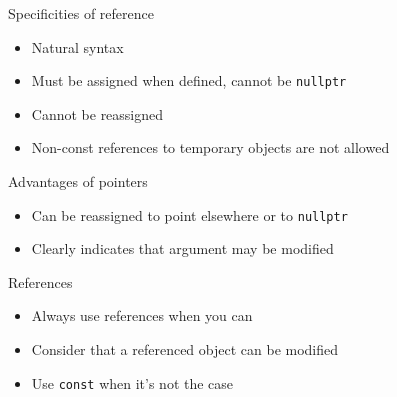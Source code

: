 \begin{frame}[fragile]
  \begin{block}{Specificities of reference}
    \begin{itemize}
    \item Natural syntax
    \item Must be assigned when defined, cannot be \texttt{nullptr}
    \item Cannot be reassigned
    \item Non-const references to temporary objects are not allowed
    \end{itemize}
  \end{block}
  \begin{block}{Advantages of pointers}
    \begin{itemize}
    \item Can be reassigned to point elsewhere or to \texttt{nullptr}
    \item Clearly indicates that argument may be modified
    \end{itemize}
  \end{block}
  \pause
  \begin{goodpractice}{References}
    \begin{itemize}
      \item Always use references when you can
      \item Consider that a referenced object can be modified
      \item Use \texttt{const} when it's not the case
    \end{itemize}
  \end{goodpractice}
\end{frame}
